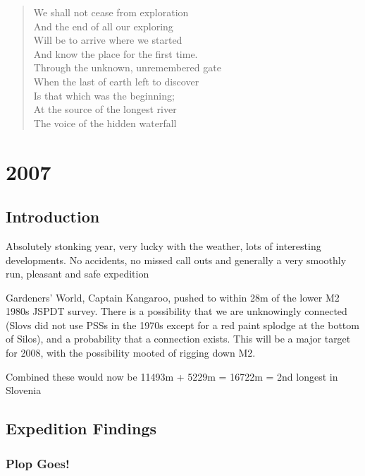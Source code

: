 
\begin{verse}
We shall not cease from exploration  \\
And the end of all our exploring  \\
Will be to arrive where we started  \\
And know the place for the first time. 
 \\
Through the unknown, unremembered gate  \\
When the last of earth left to discover  \\
Is that which was the beginning;  \\
At the source of the longest river  \\
The voice of the hidden waterfall \\
\end{verse}


\chapter{2007}\label{section}

\section{Introduction}\label{introduction}

Absolutely stonking year, very lucky with the weather, lots of
interesting developments. No accidents, no missed call outs and
generally a very smoothly run, pleasant and safe expedition

Gardeners' World, Captain Kangaroo, pushed to within 28m of the lower M2
1980s JSPDT survey. There is a possibility that we are unknowingly
connected (Slovs did not use PSSs in the 1970s except for a red paint
splodge at the bottom of Silos), and a probability that a connection
exists. This will be a major target for 2008, with the possibility
mooted of rigging down M2.

Combined these would now be 11493m + 5229m = 16722m = 2nd longest in
Slovenia

\section{Expedition Findings}\label{expedition-findings}

\subsection{Plop Goes!}\label{plop-goes}


